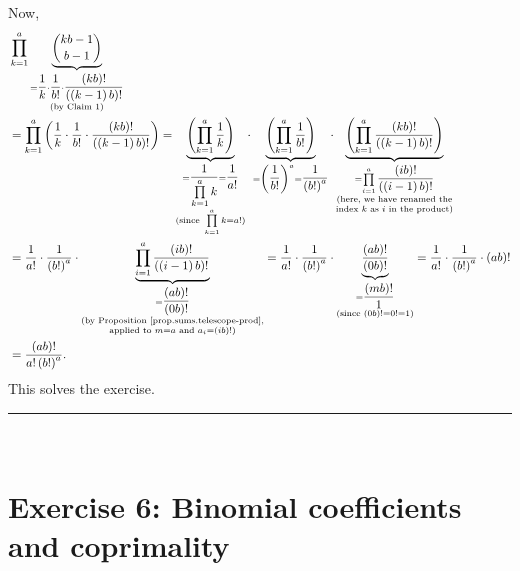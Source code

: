 \documentclass[paper=a4, fontsize=12pt]{scrartcl}%
\let\prodnonlimits\prod
\renewcommand{\prod}{\prodnonlimits\limits}
\theoremstyle{plainsl}
\theoremstyle{definition}
\theoremstyle{remark}
\begin{document}
Now,
\begin{align*}
&  \prod_{k=1}^{a}\underbrace{\dbinom{kb-1}{b-1}}_{\substack{=\dfrac{1}%
{k}\cdot\dfrac{1}{b!}\cdot\dfrac{\left(  kb\right)  !}{\left(  \left(
k-1\right)  b\right)  !}\\\text{(by Claim 1)}}}\\
&  =\prod_{k=1}^{a}\left(  \dfrac{1}{k}\cdot\dfrac{1}{b!}\cdot\dfrac{\left(
kb\right)  !}{\left(  \left(  k-1\right)  b\right)  !}\right)
=\underbrace{\left(  \prod_{k=1}^{a}\dfrac{1}{k}\right)  }_{\substack{=\dfrac
{1}{\prod_{k=1}^{a}k}=\dfrac{1}{a!}\\\text{(since }\prod_{k=1}^{a}%
k=a!\text{)}}}\cdot\underbrace{\left(  \prod_{k=1}^{a}\dfrac{1}{b!}\right)
}_{=\left(  \dfrac{1}{b!}\right)  ^{a}=\dfrac{1}{\left(  b!\right)  ^{a}}%
}\cdot\underbrace{\left(  \prod_{k=1}^{a}\dfrac{\left(  kb\right)  !}{\left(
\left(  k-1\right)  b\right)  !}\right)  }_{\substack{=\prod_{i=1}^{a}%
\dfrac{\left(  ib\right)  !}{\left(  \left(  i-1\right)  b\right)
!}\\\text{(here, we have renamed the}\\\text{index }k\text{ as }i\text{ in the
product)}}}\\
&  =\dfrac{1}{a!}\cdot\dfrac{1}{\left(  b!\right)  ^{a}}\cdot\underbrace{\prod
_{i=1}^{a}\dfrac{\left(  ib\right)  !}{\left(  \left(  i-1\right)  b\right)
!}}_{\substack{=\dfrac{\left(  ab\right)  !}{\left(  0b\right)  !}\\\text{(by
Proposition \ref{prop.sums.telescope-prod},}\\\text{applied to }m=a\text{ and
}a_{i}=\left(  ib\right)  !\text{)}}}=\dfrac{1}{a!}\cdot\dfrac{1}{\left(
b!\right)  ^{a}}\cdot\underbrace{\dfrac{\left(  ab\right)  !}{\left(
0b\right)  !}}_{\substack{=\dfrac{\left(  mb\right)  !}{1}\\\text{(since
}\left(  0b\right)  !=0!=1\text{)}}}=\dfrac{1}{a!}\cdot\dfrac{1}{\left(
b!\right)  ^{a}}\cdot\left(  ab\right)  !\\
&  =\dfrac{\left(  ab\right)  !}{a!\left(  b!\right)  ^{a}}.
\end{align*}
This solves the exercise.

\rule{\linewidth}{0.3pt} \\[0.4cm]

\section{Exercise 6: Binomial coefficients and coprimality}
\end{document}
